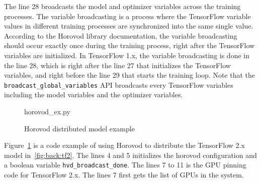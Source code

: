 The line 28 broadcasts the model and optimizer variables across the training
processes.
The variable broadcasting is a process where the TensorFlow 
variable values in different training processes are synchronized into
the same single value.
According to the Horovod library documentation, the variable broadcasting
should occur exactly once during the training process,
right after the TensorFlow variables are initialized.
In TensorFlow 1.x, the variable broadcasting is done in the line 28,
which is right after the line 27 that initializes the TensorFlow variables,
and right before the line 29 that starts the training loop.
Note that the {\tt broadcast\_global\_variables} API broadcasts every
TensorFlow variables including the model variables and the optimizer
variables.

\begin{figure}[ht!]
 
{horovod_ex.py}
  \caption{Horovod distributed model example}
\label{fig:back:hvd2} 
\end{figure}

Figure~\ref{fig:back:hvd2} is a code example of using Horovod to distribute
the TensorFlow 2.x model in~\ref{fig:back:tf2}.
The lines 4 and 5 initializes the horovod configuration and a boolean variable
{\tt hvd\_broadcast\_done}.
The lines 7 to 11 is the GPU pinning code for TensorFlow 2.x. 
The lines 7 first gets the list of GPUs in the system.
